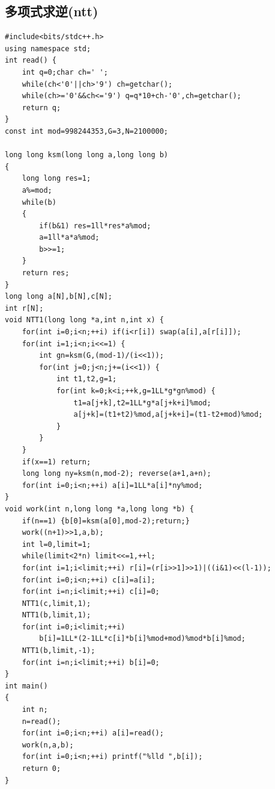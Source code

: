 \documentclass[12pt, a4paper, oneside]{ctexart}
\begin{document}
\newpage 
\subsection{多项式求逆(ntt)} 
\begin{lstlisting}
#include<bits/stdc++.h>
using namespace std;
int read() {
	int q=0;char ch=' ';
	while(ch<'0'||ch>'9') ch=getchar();
	while(ch>='0'&&ch<='9') q=q*10+ch-'0',ch=getchar();
	return q;
}
const int mod=998244353,G=3,N=2100000;

long long ksm(long long a,long long b)
{
	long long res=1;
	a%=mod;
	while(b)
	{
		if(b&1) res=1ll*res*a%mod;
		a=1ll*a*a%mod;
		b>>=1;
	}
	return res;
} 
long long a[N],b[N],c[N];
int r[N];
void NTT1(long long *a,int n,int x) {
	for(int i=0;i<n;++i) if(i<r[i]) swap(a[i],a[r[i]]);
	for(int i=1;i<n;i<<=1) {
		int gn=ksm(G,(mod-1)/(i<<1));
		for(int j=0;j<n;j+=(i<<1)) {
			int t1,t2,g=1;
			for(int k=0;k<i;++k,g=1LL*g*gn%mod) {
				t1=a[j+k],t2=1LL*g*a[j+k+i]%mod;
				a[j+k]=(t1+t2)%mod,a[j+k+i]=(t1-t2+mod)%mod;
			}
		}
	}
	if(x==1) return;
	long long ny=ksm(n,mod-2); reverse(a+1,a+n);
	for(int i=0;i<n;++i) a[i]=1LL*a[i]*ny%mod;
}
void work(int n,long long *a,long long *b) {
	if(n==1) {b[0]=ksm(a[0],mod-2);return;}
	work((n+1)>>1,a,b);
	int l=0,limit=1;
	while(limit<2*n) limit<<=1,++l;
	for(int i=1;i<limit;++i) r[i]=(r[i>>1]>>1)|((i&1)<<(l-1));
	for(int i=0;i<n;++i) c[i]=a[i];
	for(int i=n;i<limit;++i) c[i]=0;
	NTT1(c,limit,1);
	NTT1(b,limit,1);
	for(int i=0;i<limit;++i)
		b[i]=1LL*(2-1LL*c[i]*b[i]%mod+mod)%mod*b[i]%mod;
	NTT1(b,limit,-1);
	for(int i=n;i<limit;++i) b[i]=0;
}
int main()
{
	int n;
	n=read();
	for(int i=0;i<n;++i) a[i]=read();
	work(n,a,b);
	for(int i=0;i<n;++i) printf("%lld ",b[i]);
	return 0;
}
\end{lstlisting}

\newpage 
\end{document}
